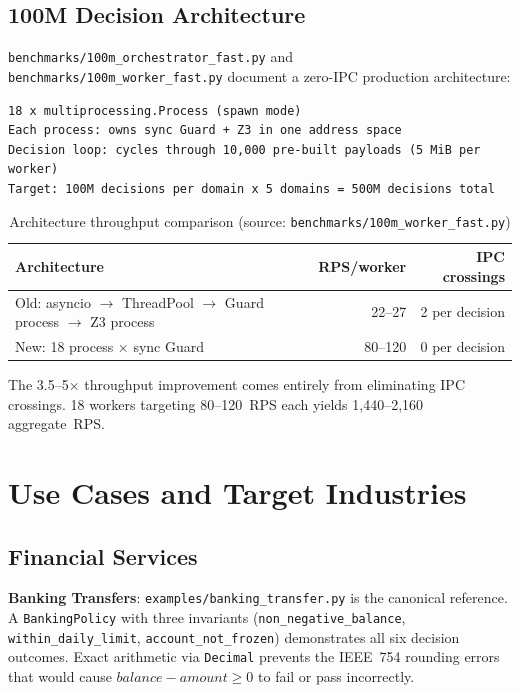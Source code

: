 \documentclass[12pt,a4paper,oneside]{report}
\newcommand{\fname}[1]{\texttt{#1}}          %
\newcommand{\code}[1]{\texttt{#1}}           %
\begin{document}
\section{100M Decision Architecture}

\fname{benchmarks/100m\_orchestrator\_fast.py} and
\fname{benchmarks/100m\_worker\_fast.py} document a zero-IPC production
architecture:

\begin{lstlisting}[style=plain,caption={100M decision target architecture}]
18 x multiprocessing.Process (spawn mode)
Each process: owns sync Guard + Z3 in one address space
Decision loop: cycles through 10,000 pre-built payloads (5 MiB per worker)
Target: 100M decisions per domain x 5 domains = 500M decisions total
\end{lstlisting}

\begin{table}[h]
\centering
\begin{tabular}{@{} p{6.5cm} r r @{}}
\toprule
\textbf{Architecture} & \textbf{RPS/worker} & \textbf{IPC crossings} \\
\midrule
Old: asyncio $\to$ ThreadPool $\to$ Guard process $\to$ Z3 process
  & 22--27 & 2 per decision \\
New: 18 process $\times$ sync Guard
  & 80--120 & 0 per decision \\
\bottomrule
\end{tabular}
\caption{Architecture throughput comparison (source:
  \fname{benchmarks/100m\_worker\_fast.py})}
\end{table}

The 3.5--5$\times$ throughput improvement comes entirely from eliminating IPC
crossings. 18 workers targeting 80--120~RPS each yields 1,440--2,160
aggregate~RPS.

\chapter{Use Cases and Target Industries}

\section{Financial Services}

\textbf{Banking Transfers}: \fname{examples/banking\_transfer.py} is the
canonical reference. A \code{BankingPolicy} with three invariants
(\code{non\_negative\_balance}, \code{within\_daily\_limit},
\code{account\_not\_frozen}) demonstrates all six decision outcomes. Exact
arithmetic via \code{Decimal} prevents the IEEE~754 rounding errors that
would cause $\mathit{balance} - \mathit{amount} \geq 0$ to fail or pass
incorrectly.
\end{document}
